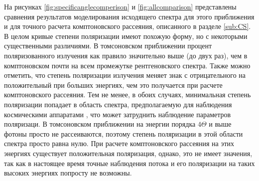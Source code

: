 \documentclass[14pt,a4paper]{extarticle}
\begin{document}
			На рисунках \ref{fig:specificanglecomperison} и \ref{fig:allcomparison} представлены сравнения результатов моделирования исходящего спектра для этого приближения и для точного расчета комптоновского рассеяния, описанного в разделе \ref{sub:CS}. 
			В целом кривые степени поляризации имеют похожую форму, но с некоторыми существенными различиями. В томсоновском приближении процент поляризованного излучения как правило значительно выше (до двух раз), чем в комптоновском почти на всем промежутке рентгеновского спектра. 
			Также можно отметить, что степень поляризации излучения меняет знак с отрицательного на положительный при больших энергиях, чем это получается при расчете комптоновского рассеяния. 
			Тем не менее, в обоих случаях, минимальная степень поляризации попадает  в область спектра, предполагаемую для наблюдения космическими аппаратами \cite{XIPE}, что может затруднить наблюдение параметров поляризаци. 
			В томсоновском приближении на энергии порядка $4\Theta$ и выше фотоны просто не рассеиваются, поэтому степень поляризации в этой области спектра просто равна нулю. 
			При расчете комптоновского рассеяния на этих энергиях существует положительная поляризация, однако, это не имеет значения, так как в настоящее время точные наблюдения потока и его поляризации на таких высоких энергиях попросту не возможны.   
			\newpage
\end{document}
